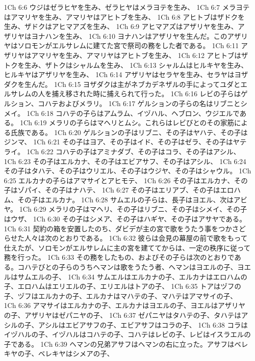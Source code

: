 1Ch 6:6  ウジはゼラヒヤを生み、ゼラヒヤはメラヨテを生み、
1Ch 6:7  メラヨテはアマリヤを生み、アマリヤはアヒトブを生み、
1Ch 6:8  アヒトブはザドクを生み、ザドクはアヒマアズを生み、
1Ch 6:9  アヒマアズはアザリヤを生み、アザリヤはヨナハンを生み、
1Ch 6:10  ヨナハンはアザリヤを生んだ。このアザリヤはソロモンがエルサレムに建てた宮で祭司の務をした者である。
1Ch 6:11  アザリヤはアマリヤを生み、アマリヤはアヒトブを生み、
1Ch 6:12  アヒトブはザトクを生み、ザトクはシャルムを生み、
1Ch 6:13  シャルムはヒルキヤを生み、ヒルキヤはアザリヤを生み、
1Ch 6:14  アザリヤはセラヤを生み、セラヤはヨザダクを生んだ。
1Ch 6:15  ヨザダクは主がネブカデネザルの手によってユダとエルサレムの人を捕え移された時に捕えられて行った。
1Ch 6:16  レビの子らはゲルション、コハテおよびメラリ。
1Ch 6:17  ゲルションの子らの名はリブニとシメイ。
1Ch 6:18  コハテの子らはアムラム、イヅハル、ヘブロン、ウジエルである。
1Ch 6:19  メラリの子らはマヘリとムシ。これらはレビびとのその家筋による氏族である。
1Ch 6:20  ゲルションの子はリブニ、その子はヤハテ、その子はジンマ、
1Ch 6:21  その子はヨア、その子はイド、その子はゼラ、その子はヤテライ。
1Ch 6:22  コハテの子はアミナダブ、その子はコラ、その子はアシル、
1Ch 6:23  その子はエルカナ、その子はエビアサフ、その子はアシル、
1Ch 6:24  その子はタハテ、その子はウリエル、その子はウジヤ、その子はシャウル。
1Ch 6:25  エルカナの子らはアマサイとアヒモテ、
1Ch 6:26  その子はエルカナ、その子はゾパイ、その子はナハテ、
1Ch 6:27  その子はエリアブ、その子はエロハム、その子はエルカナ。
1Ch 6:28  サムエルの子らは、長子はヨエル、次はアビヤ。
1Ch 6:29  メラリの子はマヘリ、その子はリブニ、その子はシメイ、その子はウザ、
1Ch 6:30  その子はシメア、その子はハギヤ、その子はアサヤである。
1Ch 6:31  契約の箱を安置したのち、ダビデが主の宮で歌をうたう事をつかさどらせた人々は次のとおりである。
1Ch 6:32  彼らは会見の幕屋の前で歌をもって仕えたが、ソロモンがエルサレムに主の宮を建ててからは、一定の秩序に従って務を行った。
1Ch 6:33  その務をしたもの、およびその子らは次のとおりである。コハテびとの子らのうちヘマンは歌をうたう者、ヘマンはヨエルの子、ヨエルはサムエルの子、
1Ch 6:34  サムエルはエルカナの子、エルカナはエロハムの子、エロハムはエリエルの子、エリエルはトアの子、
1Ch 6:35  トアはヅフの子、ヅフはエルカナの子、エルカナはマハテの子、マハテはアマサイの子、
1Ch 6:36  アマサイはエルカナの子、エルカナはヨエルの子、ヨエルはアザリヤの子、アザリヤはゼパニヤの子、
1Ch 6:37  ゼパニヤはタハテの子、タハテはアシルの子、アシルはエビアサフの子、エビアサフはコラの子、
1Ch 6:38  コラはイヅハルの子、イヅハルはコハテの子、コハテはレビの子、レビはイスラエルの子である。
1Ch 6:39  ヘマンの兄弟アサフはヘマンの右に立った。アサフはベレキヤの子、ベレキヤはシメアの子、
